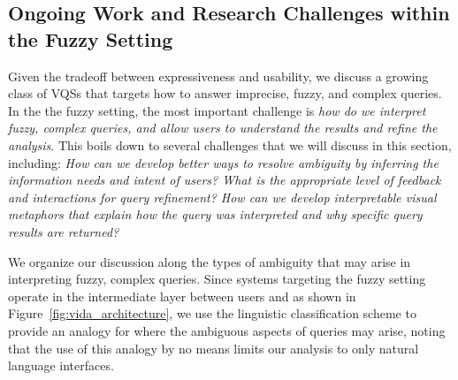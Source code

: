 
\subsection{Ongoing Work and Research Challenges within the Fuzzy Setting}
\par Given the tradeoff between 
expressiveness and usability, 
we discuss a growing class of VQSs that targets how to answer imprecise, fuzzy, and complex queries. In the the fuzzy setting, the most important challenge is {\em how do we interpret fuzzy, complex queries,
and allow users to understand the results and refine
the analysis}. This boils down to several challenges 
that we will discuss in this section,
including:
{\em How can we develop better ways to
 resolve ambiguity by inferring 
 the information needs and 
 intent of users? 
 What is the appropriate level 
 of feedback and interactions for query refinement? 
 How can we develop interpretable 
 visual metaphors that explain how the query 
 was interpreted and why specific query results are returned?} 

We organize our discussion along the 
types of ambiguity that may arise  
in interpreting fuzzy, complex queries. 
Since systems 
targeting the fuzzy setting 
operate in the intermediate layer 
between users and \vidaql 
as shown in Figure~\ref{fig:vida_architecture}, 
we use the linguistic classification scheme 
to provide an analogy for where the ambiguous 
aspects of queries may arise, 
noting that the use of this analogy 
by no means limits our analysis to only natural language interfaces.


